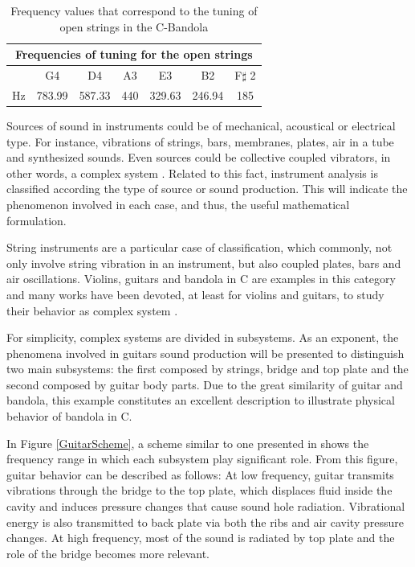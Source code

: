 \begin{table}[htb]
\centering
\begin{tabular}{|c|c|c|c|c|c|c|}\hline
\multicolumn{7}{|c|}{\vphantom{\LARGE Ap} Frequencies of tuning for the open strings}\\ \hline\hline
 & G4& D4 & A3 & E3 & B2 & F$\sharp$ 2\\ \hline
Hz & 783.99 & 587.33 & 440 & 329.63 & 246.94 & 185 \\ \hline
\end{tabular}
\caption{Frequency values that correspond to the tuning of open strings in the C-Bandola}
\label{StringTuning}
\end{table}  

Sources of sound in instruments could be of mechanical, acoustical or electrical type. For instance, vibrations of strings, bars, membranes, plates, air in a tube and synthesized sounds. Even sources could be collective coupled vibrators, in other words, a complex system \cite{Rossing}. Related to this fact, instrument analysis is classified according the type of source or sound production. This will indicate the phenomenon involved in each case, and thus, the useful mathematical formulation.

String instruments are a particular case of classification, which commonly, not only involve string vibration in an instrument, but also coupled plates, bars and air oscillations. Violins, guitars and bandola in C are examples in this category and many works have been devoted, at least for violins and guitars, to study their behavior as complex system \cite{Rossing,Christensen, Christensen3, Caldersmith1, Dickens1, Firth1}.

For simplicity, complex systems are divided in subsystems. As an exponent, the phenomena involved in guitars sound production will be presented to distinguish two main subsystems: the first composed by strings, bridge and top plate and the second composed by guitar body parts. Due to the great similarity of guitar and bandola, this example constitutes an excellent description to illustrate physical behavior of bandola in C.

In Figure \ref{GuitarScheme}, a scheme similar to one presented in \cite{Rossing} shows the frequency range in which each subsystem play significant role. From this figure, guitar behavior can be described  as follows: At low frequency, guitar transmits vibrations through the bridge to the top plate, which displaces fluid inside the cavity and induces pressure changes that cause sound hole radiation. Vibrational energy is also transmitted to back plate via both the ribs and air cavity pressure changes. At high frequency, most of the sound is radiated by top plate and the role of the bridge becomes more relevant.  

